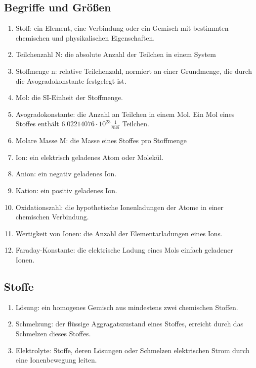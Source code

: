 \subsection{Begriffe und Größen}
\begin{enumerate}
    \item   Stoff: ein Element, eine Verbindung oder ein Gemisch mit bestimmten chemischen und physikalischen Eigenschaften.
    \item   Teilchenzahl N: die absolute Anzahl der Teilchen in einem System 
    \item   Stoffmenge n: relative Teilchenzahl, normiert an einer Grundmenge, die durch die Avogradokonstante festgelegt ist.
    \item   Mol: die SI-Einheit der Stoffmenge. 
    \item   Avogradokonstante: die Anzahl an Teilchen in einem Mol. Ein Mol eines Stoffes enthält  $6.02214076 \cdot 10^{23} \frac{1}{mol}$ Teilchen.
    \item   Molare Masse M: die Masse eines Stoffes pro Stoffmenge
    \item   Ion: ein elektrisch geladenes Atom oder Molekül. 
    \item   Anion: ein negativ geladenes Ion.
    \item   Kation: ein positiv geladenes Ion.
    \item   Oxidationszahl: die hypothetische Ionenladungen der Atome in einer chemischen Verbindung.
    \item   Wertigkeit von Ionen: die Anzahl der Elementarladungen eines Ions.
    \item   Faraday-Konstante:  die elektrische Ladung eines Mols einfach geladener Ionen.
\end{enumerate}

\subsection{Stoffe}
\begin{enumerate}
    \item   Lösung: ein homogenes Gemisch aus mindestens zwei chemischen Stoffen.
    \item   Schmelzung: der flüssige Aggragatszustand eines Stoffes, erreicht durch das Schmelzen dieses Stoffes.
    \item   Elektrolyte: Stoffe, deren Lösungen oder Schmelzen elektrischen Strom durch eine Ionenbewegung leiten.
\end{enumerate}

